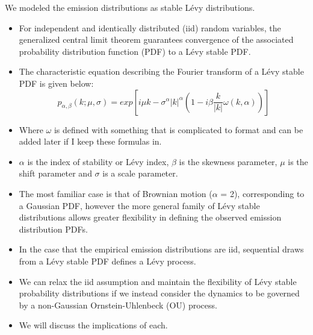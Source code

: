\documentclass{article}
\begin{document}
  \noindent We modeled the emission distributions as stable L\'evy distributions.
  \begin{itemize}
    \item For independent and identically distributed (iid) random variables, the 
    generalized central limit theorem guarantees convergence of the associated 
    probability distribution function (PDF) to a L\'evy stable PDF. \cite{klages_anomalous_2008}
    \item The characteristic equation describing the Fourier transform of a L\'evy 
    stable PDF is given below:
    \begin{equation}
    p_{\alpha, \beta}(k;\mu,\sigma) = exp\left[i\mu k - \sigma^{\alpha}|k|^{\alpha}\left(1 - i\beta\frac{k}{|k|}\omega(k, \alpha)\right)\right]
    \end{equation}
    \item Where $\omega$ is defined with something that is complicated to format and can be 
    added later if I keep these formulas in. %
    \item $\alpha$ is the index of stability or L\'evy index, $\beta$ is the skewness 
    parameter, $\mu$ is the shift parameter and $\sigma$ is a scale parameter.
    \item The most familiar case is that of Brownian motion ($\alpha$ = 2), corresponding to 
    a Gaussian PDF, however the more general family of L\'evy stable distributions allows
    greater flexibility in defining the observed emission distribution PDFs.
    \item In the case that the empirical emission distributions are iid, sequential draws
    from a L\'evy stable PDF defines a L\'evy process. 
    \item We can relax the iid assumption and maintain the flexibility of L\'evy stable 
    probability distributions if we instead consider the dynamics to be governed by a
    non-Gaussian Ornstein-Uhlenbeck (OU) process.\cite{barndorffnielsen_non-gaussian_2001}
    \item We will discuss the implications of each.  %
  \end{itemize}
  
\end{document}
